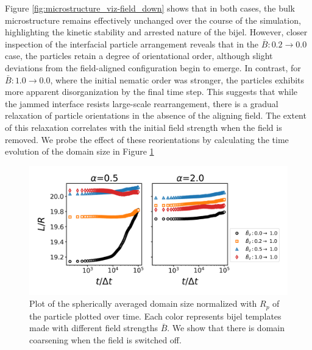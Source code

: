 Figure \ref{fig:microstructure_viz-field_down} shows that in 
both cases, the bulk microstructure remains effectively unchanged over the course of the simulation, highlighting the 
kinetic stability and arrested nature of the bijel.
However, closer inspection of the interfacial particle arrangement reveals that in the
\(\bar{B}: 0.2 \rightarrow 0.0\) case, the particles retain a degree of orientational order, although slight deviations 
from the field-aligned configuration begin to emerge. In contrast, for \(\bar{B}: 1.0 \rightarrow 0.0\), where the 
initial nematic order was stronger, the particles exhibits more apparent disorganization by the final time step. This 
suggests that while the jammed interface resists large-scale rearrangement, there is a gradual relaxation of particle 
orientations in the absence of the aligning field. The extent of this relaxation correlates with the initial field strength when 
the field is removed. We probe the effect of these reorientations by calculating the time evolution of the domain size
in Figure \ref{fig:domain_size-field_down}

\begin{figure} 
\centering 
\includegraphics[scale=0.6]{../figures/results/paper2/domain_size-field_down.png} 
\caption{Plot of the spherically averaged domain size normalized with $R_p$ of the particle plotted over time. 
         Each color represents bijel templates made with different field strengths $\bar{B}$. We show that there is domain coarsening when the field 
         is switched off.} 
\label{fig:domain_size-field_down} 
\end{figure}

